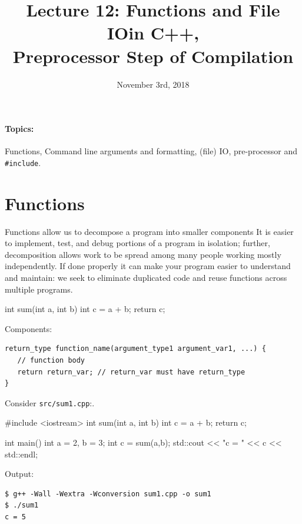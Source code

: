 \documentclass[12pt,letterpaper,twoside]{article}
\begin{document}
\title{Lecture 12: Functions and File IOin C++, \\ Preprocessor Step of Compilation\vspace{-5ex}}
\date{November 3rd, 2018}
\maketitle

{\footnotesize
\paragraph{Topics:} Functions, Command line arguments and
formatting, (file) IO, pre-processor and \texttt{\#include}.
}
\vspace{-3ex}

\section{Functions}
Functions allow us to decompose a program into smaller components
It is easier to implement, test, and debug portions of a program in isolation;
further, decomposition allows work to be spread among many people working mostly
independently.
If done properly it can make your program easier to understand and
maintain: we seek to eliminate duplicated code and reuse functions across 
multiple programs.


\begin{cpp}
int sum(int a, int b) {
  int c = a + b;
  return c;
}
\end{cpp}

Components:

{\small
\begin{verbatim}
return_type function_name(argument_type1 argument_var1, ...) {
   // function body
   return return_var; // return_var must have return_type
}
\end{verbatim}
}

Consider \texttt{src/sum1.cpp}:.
\begin{cpp}
#include <iostream>
int sum(int a, int b) {
  int c = a + b;
  return c;
}

int main() {
  int a = 2, b = 3;
  int c = sum(a,b);
  std::cout << "c = " << c << std::endl;
}
\end{cpp}

Output:

\begin{verbatim}
$ g++ -Wall -Wextra -Wconversion sum1.cpp -o sum1
$ ./sum1
c = 5
\end{verbatim}
\end{document}
